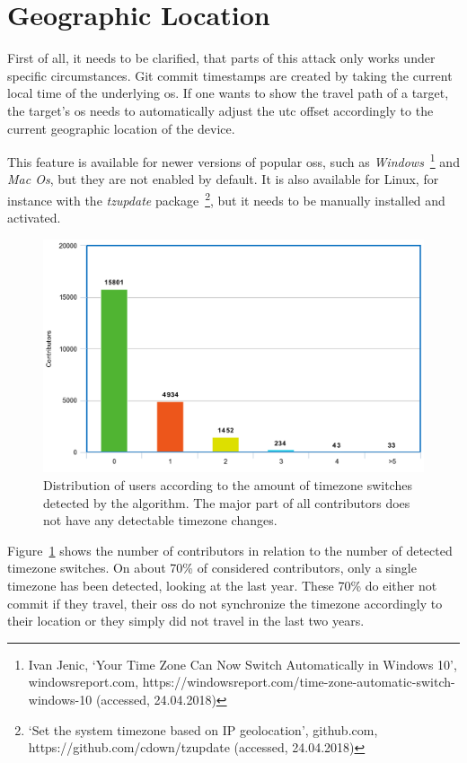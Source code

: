 \section{Geographic Location}

First of all, it needs to be clarified, that parts of this attack only works under specific circumstances.
Git commit timestamps are created by taking the current local time of the underlying \ac{os}.
If one wants to show the travel path of a target, the target's \ac{os} needs to automatically adjust the \ac{utc} offset accordingly to the current geographic location of the device.

This feature is available for newer versions of popular \acp{os}, such as \emph{Windows}~\footnote{Ivan Jenic, `Your Time Zone Can Now Switch Automatically in Windows 10', windowsreport.com, https://windowsreport.com/time-zone-automatic-switch-windows-10 (accessed, 24.04.2018)}
and \emph{Mac Os}, but they are not enabled by default.
It is also available for Linux, for instance with the \emph{tzupdate} package~\footnote{`Set the system timezone based on IP geolocation', github.com, https://github.com/cdown/tzupdate (accessed, 24.04.2018)}, but it needs to be manually installed and activated.

\begin{figure}[H]
    \includegraphics[scale=0.38]{./graphs/analysis/timezone-switch-distribution}
    \centering
    \caption{Distribution of users according to the amount of timezone switches detected by the algorithm.
    The major part of all contributors does not have any detectable timezone changes.}\label{fig:timezone-switch-distribution}
\end{figure}

Figure~\ref{fig:timezone-switch-distribution} shows the number of contributors in relation to the number of detected timezone switches.
On about 70\% of considered contributors, only a single timezone has been detected, looking at the last year.
These 70\% do either not commit if they travel, their \acp{os} do not synchronize the timezone accordingly to their location or they simply did not travel in the last two years.

